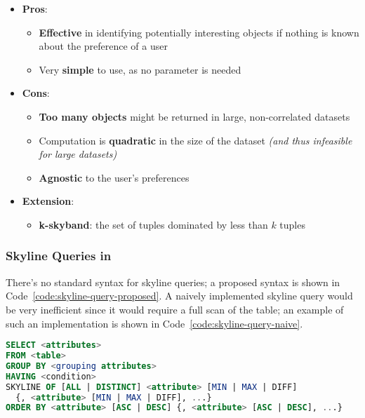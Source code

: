 \documentclass[english]{article}
\begin{document}
\begin{itemize}
  \item \textbf{Pros}:
        \begin{itemize}[label=\cmarkthin]
          \item \textbf{Effective} in identifying potentially interesting objects if nothing is known about the preference of a user
          \item Very \textbf{simple} to use, as no parameter is needed
        \end{itemize}
  \item \textbf{Cons}:
        \begin{itemize}[label=\xmarkthin]
          \item \textbf{Too many objects} might be returned in large, non-correlated datasets
          \item Computation is \textbf{quadratic} in the size of the dataset \textit{(and thus infeasible for large datasets)}
          \item \textbf{Agnostic} to the user's preferences
        \end{itemize}
  \item \textbf{Extension}:
        \begin{itemize}
          \item \textbf{k-skyband}: the set of tuples dominated by less than \(k\) tuples
        \end{itemize}
\end{itemize}

\subsubsection{Skyline Queries in \sql}

There's no standard \sql syntax for skyline queries;
a proposed syntax is shown in Code~\ref{code:skyline-query-proposed}.
A naively implemented skyline query would be very inefficient since it would require a full scan of the table;
an example of such an implementation is shown in Code~\ref{code:skyline-query-naive}.

\begin{lstlisting}[language=sql, morekeywords={SKYLINE}, caption={Proposed syntax for skyline queries}, label=code:skyline-query-proposed]
SELECT <attributes>
FROM <table>
GROUP BY <grouping attributes>
HAVING <condition>
SKYLINE OF [ALL | DISTINCT] <attribute> [MIN | MAX | DIFF]
  {, <attribute> [MIN | MAX | DIFF], ...}
ORDER BY <attribute> [ASC | DESC] {, <attribute> [ASC | DESC], ...}
\end{lstlisting}
\end{document}
